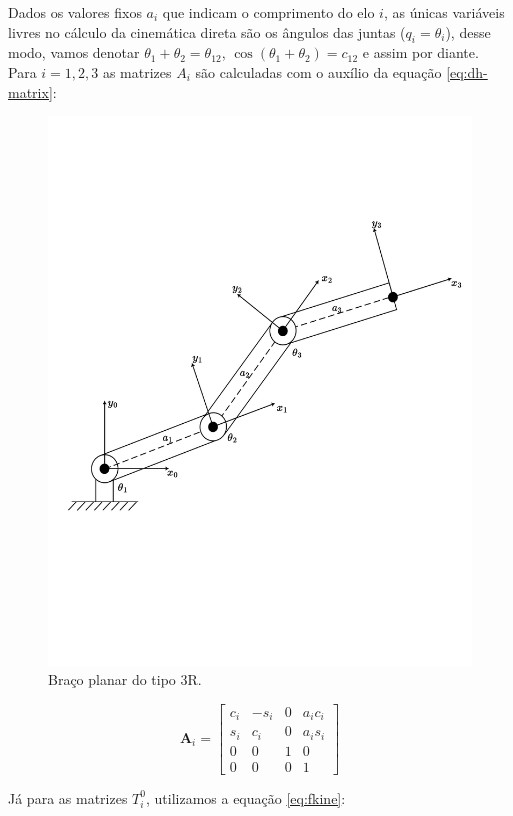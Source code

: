 Dados os valores fixos \(a_i\) que indicam o comprimento do elo \(i\), as únicas variáveis livres no cálculo da cinemática direta são os ângulos das juntas ($q_i = \theta_i$), desse modo, vamos denotar \(\theta_1 + \theta_2 = \theta_{12}\), \(\cos(\theta_1 + \theta_2) = c_{12}\) e assim por diante. Para \(i = 1, 2, 3\) as matrizes $A_i$ são calculadas com o auxílio da equação \ref{eq:dh-matrix}:

\begin{figure}
  \centering
  \includegraphics[width=0.8\linewidth]{export.pdf} %
  \caption{Braço planar do tipo 3R.}
  \label{fig:3r-planar-arm}
\end{figure}

\begin{equation}
    \bm{A}_i = \begin{bmatrix}
        c_i & -s_i & 0 & a_i c_i \\
        s_i & c_i & 0 & a_i s_i \\
        0 & 0 & 1 & 0 \\
        0 & 0 & 0 & 1
    \end{bmatrix}
\end{equation}

Já para as matrizes \(T^0_i\), utilizamos a equação \ref{eq:fkine}:

